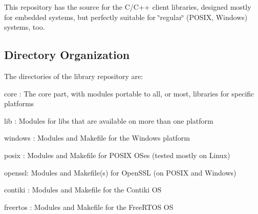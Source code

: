 This repository has the source for the C/\-C++ client libraries, designed mostly for embedded systems, but perfectly suitable for \char`\"{}regular\char`\"{} (P\-O\-S\-I\-X, Windows) systems, too.

\subsection*{Directory Organization}

The directories of the library repository are\-:


\begin{DoxyItemize}
\item {\ttfamily core} \-: The core part, with modules portable to all, or most, libraries for specific platforms
\item {\ttfamily lib} \-: Modules for libs that are available on more than one platform
\item {\ttfamily windows} \-: Modules and Makefile for the Windows platform
\item {\ttfamily posix} \-: Modules and Makefile for P\-O\-S\-I\-X O\-Ses (tested mostly on Linux)
\item {\ttfamily openssl}\-: Modules and Makefile(s) for Open\-S\-S\-L (on P\-O\-S\-I\-X and Windows)
\item {\ttfamily contiki} \-: Modules and Makefile for the Contiki O\-S
\item {\ttfamily freertos} \-: Modules and Makefile for the Free\-R\-T\-O\-S O\-S 
\end{DoxyItemize}